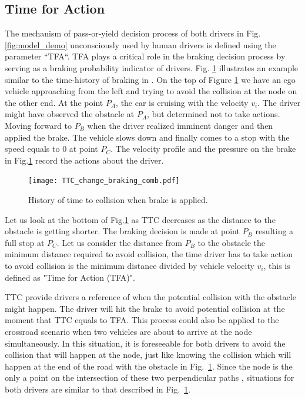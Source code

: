
\subsection{Time for Action}

The mechanism of pass-or-yield decision process of both drivers in Fig.\ref{fig:model_demo} unconsciously used by human drivers is defined using the parameter ``\ac*{TFA}``. TFA plays a critical role in the braking decision process by serving as a braking probability indicator of drivers. Fig. \ref{fig:TTC_brake_comb} illustrates an example similar to the time-history of braking in \cite{time_history}. On the top of Figure \ref{fig:TTC_brake_comb} we have an ego vehicle approaching from the left and trying to avoid the collision at the node on the other end. At the point $P_A$, the car is cruising with the velocity $v_i$. The driver might have observed the obstacle at $P_A$, but determined not to take actions. Moving forward to $P_B$ when the driver realized imminent danger and then applied the brake. The vehicle slows down and finally comes to a stop with the speed equals to $0$ at point $P_C$. The velocity profile and the pressure on the brake in Fig.\ref{fig:TTC_brake_comb} record the actions about the driver. 

\begin{figure}[htbp!]
\begin{center}
\texttt{[image: TTC\_change\_braking\_comb.pdf]}
\end{center}
\caption{History of time to collision when brake is applied.}
\label{fig:TTC_brake_comb} 
\end{figure}
Let us look at the bottom of Fig.\ref{fig:TTC_brake_comb} as TTC decreases as the distance to the obstacle is getting shorter. The braking decision is made at point $P_B$ resulting a full stop at $P_C$. Let us consider the distance from $P_B$ to the obstacle the minimum distance required to avoid collision, the time driver has to take action to avoid collision is the minimum distance divided by vehicle velocity $v_i$, this is defined as "Time for Action (TFA)". 

TTC provide drivers a reference of when the potential collision with the obstacle might happen. The driver will hit the brake to avoid potential collision at the moment that TTC equals to TFA. This process could also be applied to the crossroad scenario when two vehicles are about to arrive at the node simultaneously. In this situation, it is foreseeable for both drivers to avoid the collision that will happen at the node, just like knowing the collision which will happen at the end of the road with the obstacle in Fig.~\ref{fig:TTC_brake_comb}. Since the node is the only a point on the intersection of these two perpendicular paths , situations for both drivers are similar to that described in Fig.~\ref{fig:TTC_brake_comb}. 


